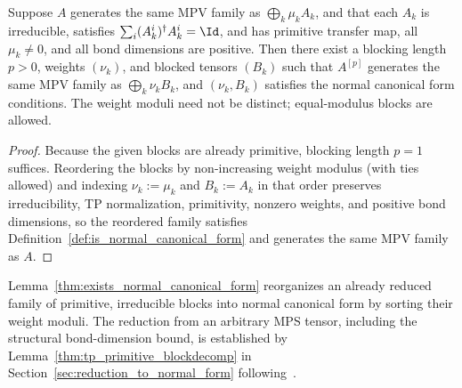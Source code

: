 \begin{lemma}%
    \label{thm:exists_normal_canonical_form}
    \leanok
    Suppose $A$ generates the same MPV family as $\bigoplus_k\mu_kA_k$, and
    that each $A_k$ is irreducible, satisfies
    $\sum_i(A_k^i)^\dagger A_k^i=\Id$, and has primitive transfer map, all
    $\mu_k\neq0$, and all bond dimensions are positive. Then there exist a
    blocking length $p>0$, weights $(\nu_k)$, and blocked tensors $(B_k)$ such
    that $A^{[p]}$ generates the same MPV family as $\bigoplus_k\nu_kB_k$,
    and $(\nu_k,B_k)$ satisfies the normal canonical form conditions. The
    weight moduli need not be distinct; equal-modulus blocks are allowed.
\end{lemma}

\begin{proof}\leanok
    Because the given blocks are already primitive, blocking length $p=1$
    suffices. Reordering the blocks by non-increasing weight modulus (with ties
    allowed) and indexing $\nu_k:=\mu_k$ and $B_k:=A_k$ in that order preserves
    irreducibility, TP normalization, primitivity, nonzero weights, and positive
    bond dimensions, so the reordered family satisfies
    Definition~\ref{def:is_normal_canonical_form} and generates the same MPV
    family as $A$.
\end{proof}

\begin{remark}
    Lemma~\ref{thm:exists_normal_canonical_form} reorganizes an already
    reduced family of primitive, irreducible blocks into normal canonical form
    by sorting their weight moduli. The reduction from an arbitrary MPS tensor,
    including the structural bond-dimension bound, is established by
    Lemma~\ref{thm:tp_primitive_blockdecomp} in
    Section~\ref{sec:reduction_to_normal_form} following~\cite[Section~2.3]{Cirac2016MPDO_arXiv}.
\end{remark}
